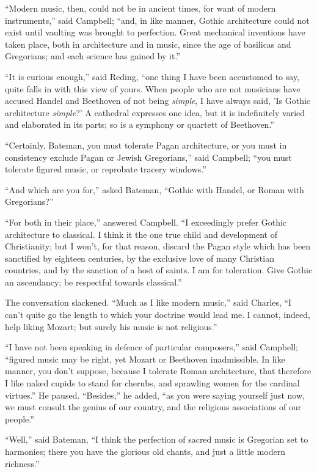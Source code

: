 ``Modern music, then, could not be in ancient times, for want
of modern instruments,'' said Campbell; ``and, in like manner,
Gothic architecture could not exist until vaulting was brought to
perfection. Great mechanical inventions have taken place, both in
architecture and in music, since the age of basilicas and Gregorians;
and each science has gained by it.''

``It is curious enough,'' said Reding, ``one thing I
have been accustomed to say, quite falls in with this view of yours.
When people who are not musicians have accused Handel and Beethoven of
not being \emph{simple}, I have always said, 'Is Gothic architecture \emph{simple}?'
A cathedral expresses one idea, but it is indefinitely varied and
elaborated in its parts; so is a symphony or quartett of
Beethoven.''

``Certainly, Bateman, you must tolerate Pagan architecture, or
you must in consistency exclude Pagan or Jewish Gregorians,'' said
Campbell; ``you must tolerate figured music, or reprobate tracery
windows.''

``And which are you for,'' asked Bateman, ``Gothic with
Handel, or Roman with Gregorians?''

``For both in their place,'' answered Campbell. ``I
exceedingly prefer Gothic architecture to classical. I think it the
one true child and development of Christianity; but I won't, for that
reason, discard the Pagan style which has been sanctified by eighteen
centuries, by the exclusive love of many Christian countries, and by
the sanction of a host of saints. I am for toleration. Give Gothic an
ascendancy; be respectful towards classical.''

The conversation slackened. ``Much as I like modern
music,'' said Charles, ``I can't quite go the length to which
your doctrine would lead me. I cannot, indeed, help liking Mozart; but
surely his music is not religious.''

``I have not been speaking in defence of particular
composers,'' said Campbell; ``figured music may be right, yet
Mozart or Beethoven inadmissible. In like manner, you don't suppose,
because I tolerate Roman architecture, that therefore I like naked
cupids to stand for cherubs, and sprawling women for the cardinal
virtues.'' He paused. ``Besides,'' he added, ``as you
were saying yourself just now, we must consult the genius of our
country, and the religious associations of our people.''

``Well,'' said Bateman, ``I think the perfection of
sacred music is Gregorian set to harmonies; there you have the
glorious old chants, and just a little modern richness.''

